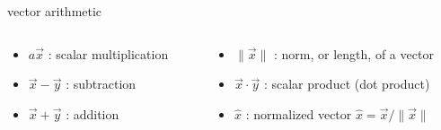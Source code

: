 \begin{frame}[fragile]{vector arithmetic}
\begin{columns}
 \begin{column}{0.5\linewidth}
  \begin{itemize}
   \item $a\vec{x}$ : scalar multiplication
   \item $\vec{x} - \vec{y}$ : subtraction
   \item $\vec{x} + \vec{y}$ : addition
  \end{itemize}
  \end{column}
  \pause

  \begin{column}{0.5\linewidth}
  \begin{itemize}
   \item $\|\vec{x}\|$ : norm, or length, of a vector
   \item $\vec{x} \cdot \vec{y}$ : scalar product (dot product)
   \item $\hat{x}$ : normalized vector $\hat{x} = \vec{x}/\|\vec{x}\|$
  \end{itemize}
  \end{column}
 \end{columns}

\vspace{40pt}


\end{frame}


